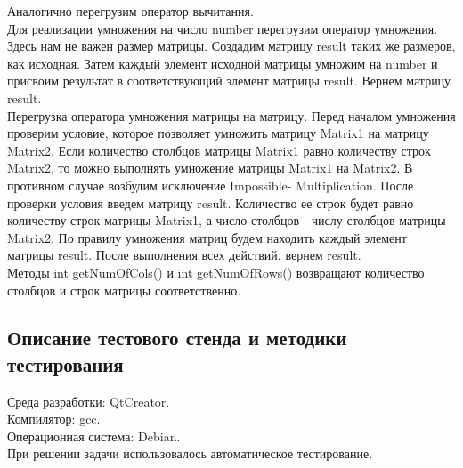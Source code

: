 \documentclass[12pt,a4paper]{report}
\begin{document}
Аналогично перегрузим оператор вычитания. \\
Для реализации умножения на число number перегрузим оператор умножения. Здесь нам не важен размер матрицы. Создадим матрицу result таких же размеров, как исходная. Затем каждый элемент исходной матрицы умножим на number и присвоим результат в соответствующий элемент матрицы result. Вернем матрицу result. \\
Перегрузка оператора умножения матрицы на матрицу. Перед началом умножения проверим условие, которое позволяет умножить матрицу Matrix1 на матрицу Matrix2. Если количество столбцов матрицы Matrix1 равно количеству строк Matrix2, то можно выполнять умножение матрицы Matrix1 на Matrix2. В противном случае возбудим исключение Impossible- Multiplication. После проверки условия введем матрицу result. Количество ее строк будет равно количеству строк матрицы Matrix1, а число столбцов - числу столбцов матрицы Matrix2. По правилу умножения матриц будем находить каждый элемент матрицы result. После выполнения всех действий, вернем result. \\
Методы int getNumOfCols() и int getNumOfRows() возвращают количество столбцов и строк матрицы соответственно. 
\subsection{Описание тестового стенда и методики тестирования}
Среда разработки: QtCreator.\\
Компилятор: gcc. \\
Операционная система: Debian. \\
При решении задачи использовалось автоматическое тестирование. 
\end{document}
